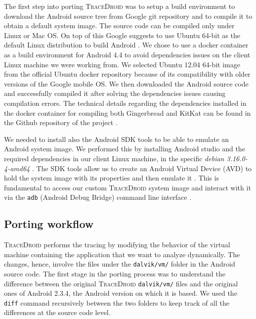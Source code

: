 The first step into porting \textsc{TraceDroid} was to setup a build
environment to download the Android source tree from Google git
repository and to compile it to obtain a default system image. The
source code can be compiled only under Linux or Mac OS. On top of this
Google suggests to use Ubuntu 64-bit as the default Linux distribution
to build Android \cite{ref18}. We chose to use a docker container as a build
environment for Android 4.4 to avoid dependencies issues on the client
Linux machine we were working from. We selected Ubuntu 12.04 64-bit
image from the official Ubuntu docker repository because of its
compatibility with older versions of the Google mobile OS. We then
downloaded the Android source code \cite{ref19} and successfully compiled it after
solving the dependencies issues causing compilation errors. The
technical details regarding the dependencies installed in the docker
container for compiling both Gingerbread and KitKat can be found in
the Github repository of the project \cite{ref15}.

We needed to install also the Android SDK tools \cite{ref21} to be able to emulate
an Android system image. We performed this by installing Android
studio and the required dependencies in our client Linux machine, in
the specific \textit{debian 3.16.0-4-amd64} \cite{ref20}. The SDK tools allow
us to create an Android Virtual Device (AVD) to hold the system image
with its properties and then emulate it \cite{ref15}. This is fundamental to
access our custom \textsc{TraceDroid} system image and interact with
it via the \texttt{adb} (Android Debug Bridge) command line interface
\cite{ref22}.

\subsection{Porting workflow}
\label{sec:porting_workflow}

\textsc{TraceDroid} \cite{ref1} performs the tracing by modifying the behavior of the
virtual machine containing the application that we want to analyze
dynamically. The changes, hence, involve the files under the
\texttt{dalvik/vm/} folder in the Android source code. The first stage in the
porting process was to understand the difference between the original
\textsc{TraceDroid} \texttt{dalvik/vm/} files and the original ones of Android 2.3.4,
the Android version on which it is based. We used the \texttt{diff} command
recursively between the two folders to keep track of all the
differences at the source code level.

